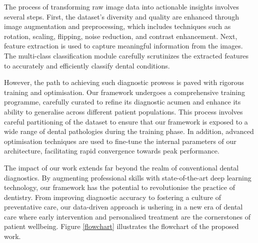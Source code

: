 \documentclass[journal,twoside,web]{ieeecolor}
\begin{document}
The process of transforming raw image data into actionable insights involves several steps. First, the dataset's diversity and quality are enhanced through image augmentation and preprocessing, which includes techniques such as rotation, scaling, flipping, noise reduction, and contrast enhancement. Next, feature extraction is used to capture meaningful information from the images. The multi-class classification module carefully scrutinizes the extracted features to accurately and efficiently classify dental conditions.


However, the path to achieving such diagnostic prowess is paved with rigorous training and optimisation. Our framework undergoes a comprehensive training programme, carefully curated to refine its diagnostic acumen and enhance its ability to generalise across different patient populations. This process involves careful partitioning of the dataset to ensure that our framework is exposed to a wide range of dental pathologies during the training phase. In addition, advanced optimisation techniques are used to fine-tune the internal parameters of our architecture, facilitating rapid convergence towards peak performance.

The impact of our work extends far beyond the realm of conventional dental diagnostics. By augmenting professional skills with state-of-the-art deep learning technology, our framework has the potential to revolutionise the practice of dentistry. From improving diagnostic accuracy to fostering a culture of preventative care, our data-driven approach is ushering in a new era of dental care where early intervention and personalised treatment are the cornerstones of patient wellbeing.
Figure \ref{flowchart} illustrates the flowchart of the proposed work.
\end{document}

